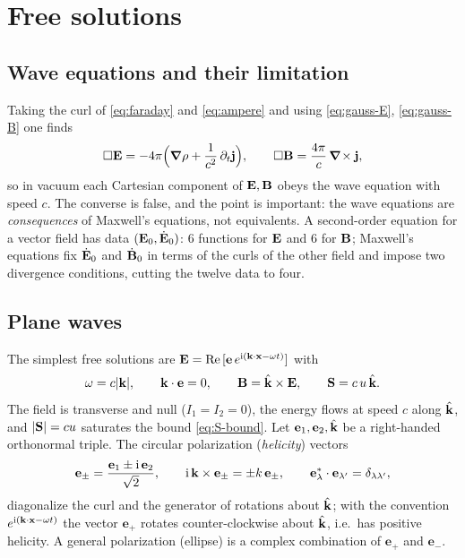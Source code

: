 \section{Free solutions}\label{sec:mx-free}

\subsection{Wave equations and their limitation}

Taking the curl of \eqref{eq:faraday} and \eqref{eq:ampere} and using
\eqref{eq:gauss-E}, \eqref{eq:gauss-B} one finds
\begin{equation}\label{eq:wave-EB}
\Box\mathbf{E}=-4\pi\Big(\boldsymbol{\nabla}\rho+\frac1{c^2}\,\partial_t\mathbf{j}\Big),\qquad
\Box\mathbf{B}=\frac{4\pi}{c}\,\boldsymbol{\nabla}\!\times\mathbf{j} ,
\end{equation}
so in vacuum each Cartesian component of $\mathbf{E},\mathbf{B}$ obeys the wave
equation with speed $c$.  The converse is false, and the point is
important: the wave equations are \emph{consequences} of Maxwell's
equations, not equivalents.  A second-order equation for a vector field has
data $(\mathbf{E}_0,\dot{\mathbf{E}}_0)$: $6$ functions for $\mathbf{E}$ and $6$ for $\mathbf{B}$;
Maxwell's equations fix $\dot{\mathbf{E}}_0$ and $\dot{\mathbf{B}}_0$ in terms of the curls
of the other field and impose two divergence conditions, cutting the
twelve data to four.

\subsection{Plane waves}

The simplest free solutions are
$\mathbf{E}=\operatorname{Re}\,[\mathbf e\,e^{\mathrm{i}(\mathbf{k}\cdot\mathbf{x}-\omega t)}]$ with
\begin{equation}\label{eq:plane}
\omega=c|\mathbf{k}|,\qquad \mathbf{k}\cdot\mathbf e=0,\qquad
\mathbf{B}=\hat{\mathbf{k}}\times\mathbf{E},\qquad \mathbf{S}=c\,u\,\hat{\mathbf{k}}.
\end{equation}
The field is transverse and null ($I_1=I_2=0$), the energy flows at speed $c$
along $\hat{\mathbf{k}}$, and $|\mathbf{S}|=cu$ saturates the bound \eqref{eq:S-bound}.
Let $\mathbf e_1,\mathbf e_2,\hat{\mathbf{k}}$ be a right-handed orthonormal
triple.  The circular polarization (\emph{helicity}) vectors
\begin{equation}
\mathbf e_\pm=\frac{\mathbf e_1\pm\mathrm{i}\,\mathbf e_2}{\sqrt2},\qquad
\mathrm{i}\,\mathbf{k}\times\mathbf e_\pm=\pm k\,\mathbf e_\pm ,\qquad
\mathbf e_\lambda^*\cdot\mathbf e_{\lambda'}=\delta_{\lambda\lambda'},
\end{equation}
diagonalize the curl and the generator of rotations about $\hat{\mathbf{k}}$;
with the convention $e^{\mathrm{i}(\mathbf{k}\cdot\mathbf{x}-\omega t)}$ the vector
$\mathbf e_+$ rotates counter-clockwise about $\hat{\mathbf{k}}$, i.e.\ has
positive helicity.  A general polarization (ellipse) is a complex
combination of $\mathbf e_+$ and $\mathbf e_-$.

